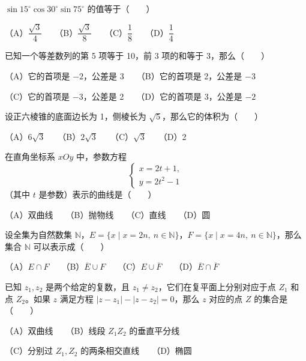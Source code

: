 \begin{question}

$\sin15^\circ\cos30^\circ\sin75^\circ$ 的值等于\mbox{（　　）}

（A）$\dfrac{\sqrt3}4$　　（B）$\dfrac{\sqrt3}8$　　（C）$\dfrac18$　　（D）$\dfrac14$

\end{question}
\begin{question}

已知一个等差数列的第 5 项等于 10，前 3 项的和等于 3，那么\mbox{（　　）}

（A）它的首项是 $-2$，公差是 3　　（B）它的首项是 2，公差是 $-3$

（C）它的首项是 $-3$，公差是 2　　（D）它的首项是 3，公差是 $-2$

\end{question}
\begin{question}

设正六棱锥的底面边长为 1，侧棱长为 $\sqrt5$，那么它的体积为\mbox{（　　）}

（A）$6\sqrt3$　　（B）$2\sqrt3$　　（C）$\sqrt3$　　（D）2

\end{question}
\begin{question}

在直角坐标系 $xOy$ 中，参数方程
\nopagebreak[4]
\[
\begin{cases}
x=2t+1,\\
y=2t^2-1
\end{cases}
\]
（其中 $t$ 是参数）表示的曲线是\mbox{（　　）}

（A）双曲线　　（B）抛物线　　（C）直线　　（D）圆

\end{question}
\begin{question}

设全集为自然数集 $\mathbb N$，$E=\{x\mid x=2n,\ n\in\mathbb N\}$，$F=\{x\mid x=4n,\ n\in\mathbb N\}$，那么集合 $\mathbb N$ 可以表示成\mbox{（　　）}

（A）$E\cap F$　　（B）$\overline E\cup F$　　（C）$E\cup\overline F$　　（D）$\overline E\cap\overline F$

\end{question}
\begin{question}

已知 $z_1,z_2$ 是两个给定的复数，且 $z_1\ne z_2$，它们在复平面上分别对应于点 $Z_1$ 和点 $Z_2$。如果 $z$ 满足方程 $|z-z_1|-|z-z_2|=0$，那么 $z$ 对应的点 $Z$ 的集合是\mbox{（　　）}

（A）双曲线　　（B）线段 $Z_1Z_2$ 的垂直平分线

（C）分别过 $Z_1,Z_2$ 的两条相交直线　　（D）椭圆

\end{question}
